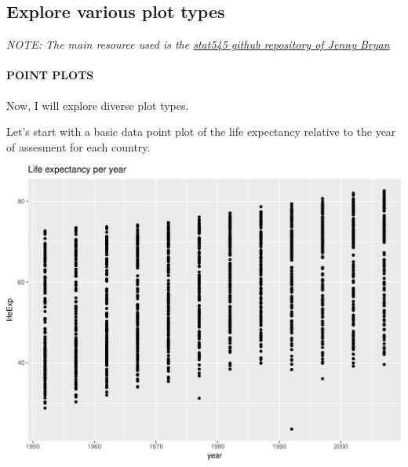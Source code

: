 \documentclass[]{article}
\newenvironment{Shaded}{\begin{snugshade}}{\end{snugshade}}
\newcommand{\KeywordTok}[1]{\textcolor[rgb]{0.13,0.29,0.53}{\textbf{{#1}}}}
\newcommand{\DataTypeTok}[1]{\textcolor[rgb]{0.13,0.29,0.53}{{#1}}}
\newcommand{\StringTok}[1]{\textcolor[rgb]{0.31,0.60,0.02}{{#1}}}
\newcommand{\NormalTok}[1]{{#1}}
\let\oldparagraph\paragraph
\renewcommand{\paragraph}[1]{\oldparagraph{#1}\mbox{}}
\begin{document}
\subsection{Explore various plot
types}\label{explore-various-plot-types}

\emph{NOTE: The main resource used is the
\href{https://github.com/jennybc/ggplot2-tutorial/blob/master/gapminder-ggplot2-univariate-quantitative.md}{stat545
github repository of Jenny Bryan}}

\paragraph{POINT PLOTS}\label{point-plots}

Now, I will explore diverse plot types.

Let's start with a basic data point plot of the life expectancy relative
to the year of assesment for each country.

\begin{Shaded}
\end{Shaded}

\includegraphics{gapminder-exploration-phase2_files/figure-latex/unnamed-chunk-11-1.pdf}
\end{document}
